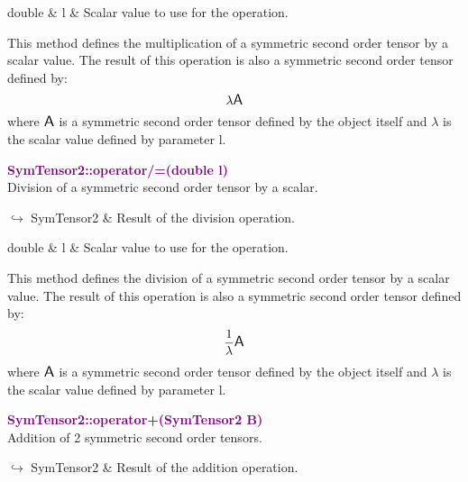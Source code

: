 \begin{tcolorbox}[width=\textwidth,myArgs,tabularx={ll|R}]
double & l & Scalar value to use for the operation.
\end{tcolorbox}

This method defines the multiplication of a symmetric second order tensor by a scalar value.
The result of this operation is also a symmetric second order tensor defined by:
\begin{equation*}
\lambda \mbox{\large\ensuremath{\mathsf{A}}}
\end{equation*}
where $\mbox{\large\ensuremath{\mathsf{A}}}$ is a symmetric second order tensor defined by the object itself and $\lambda$ is the scalar value defined by parameter l.

\textcolor{purple}{\textbf{SymTensor2::operator/=(double l)}}\label{SymTensor2::operator/=(double l)}\\
Division of a symmetric second order tensor by a scalar.\vspace*{-0.5em}
\begin{tcolorbox}[grow to left by=-1cm, width=\textwidth-1cm,myArgs,tabularx={l|R}]
$\hookrightarrow$ SymTensor2 & Result of the division operation.
\end{tcolorbox}

\begin{tcolorbox}[width=\textwidth,myArgs,tabularx={ll|R}]
double & l & Scalar value to use for the operation.
\end{tcolorbox}

This method defines the division of a symmetric second order tensor by a scalar value.
The result of this operation is also a symmetric second order tensor defined by:
\begin{equation*}
\frac{1}{\lambda} \mbox{\large\ensuremath{\mathsf{A}}}
\end{equation*}
where $\mbox{\large\ensuremath{\mathsf{A}}}$ is a symmetric second order tensor defined by the object itself and $\lambda$ is the scalar value defined by parameter l.

\textcolor{purple}{\textbf{SymTensor2::operator+(SymTensor2 B)}}\label{SymTensor2::operator+(SymTensor2 B)}\\
Addition of 2 symmetric second order tensors.\vspace*{-0.5em}
\begin{tcolorbox}[grow to left by=-1cm, width=\textwidth-1cm,myArgs,tabularx={l|R}]
$\hookrightarrow$ SymTensor2 & Result of the addition operation.
\end{tcolorbox}

